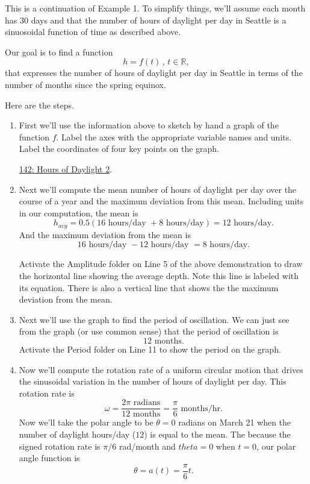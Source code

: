 \documentclass{ximera}
\begin{document}
\begin{example}  \label{EDFredsfRRER}
This is a continuation of Example 1. To simplify things, we'll assume each month has $30$ days and that the number of hours of daylight per day in Seattle is a sinuosoidal function of time as described above.

Our goal is to find a function 
\[
  h = f(t) \, , \, t\in \mathbb{R},
\] 
that expresses the number of hours of daylight per day in Seattle in terms of the number of months since the spring equinox.


Here are the steps.

\begin{enumerate}

\item  First we'll use the information above to sketch by hand a graph of the function $f$. Label the axes with the appropriate variable names and units. Label the coordinates of four key points on the graph.

\href{https://www.desmos.com/calculator/gw4xkdcvhi}{142: Hours of Daylight 2}.

 
\begin{onlineOnly}
    \begin{center}
\end{center}
\end{onlineOnly}

\item Next we'll compute the mean number of hours of daylight per day over the course of a year and the maximum deviation from this mean. Including units in our computation, the mean is 
\[
    h_{avg} = 0.5 ( 16 \text{ hours/day } + 8 \text{ hours/day}) = 12 \text{ hours/day} . 
\]
And the maximum deviation from the mean is
\[
     16 \text{ hours/day } - 12 \text{ hours/day } = 8 \text{ hours/day}.
\]

Activate the Amplitude folder on Line 5 of the above demonstration to draw the horizontal line showing the average depth. Note this line is labeled with its equation. There is also a vertical line that shows the the maximum deviation from the mean.

\item Next we'll use the graph to find the period of oscillation. We can just see from the graph (or use common sense) that the period of oscillation is
\[
     12 \text{ months}.
\]
Activate the Period folder on Line 11 to show the period on the graph.

\item Now we'll compute the rotation rate of a uniform circular motion that drives the sinusoidal variation in the number of hours of daylight per day. This rotation rate is
\[
  \omega = \frac{2\pi \text{ radians}}{12 \text{ months}} = \frac{\pi}{6} \text{ months/hr} .
\]
Now we'll take the polar angle to be $\theta=0$ radians on March 21 when the number of daylight hours/day ($12$) is equal to the mean.  The because the signed rotation rate is $\pi/6$ rad/month and $theta = 0$ when $t=0$, our polar angle function is
\[
   \theta = a(t) = \frac{\pi}{6}t.
\]


\end{enumerate}
\end{example}
\end{document}
